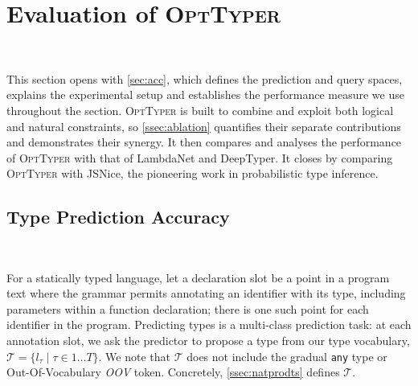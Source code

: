 \documentclass[acmsmall, review, anonymous]{acmart}\settopmatter{printfolios=true,printccs=false,printacmref=false}
\newcommand{\projectname}{\textsc{OptTyper}\xspace}
\begin{document}

\section{Evaluation of \projectname{}}~\label{sec:eval}

This section opens with \autoref{sec:acc}, which defines the prediction and query spaces, explains the experimental setup and establishes the performance measure we use throughout the section.
\projectname is built to combine and exploit both logical and natural constraints, so \autoref{ssec:ablation} quantifies their separate contributions and demonstrates their synergy.
It then compares and analyses the performance of \projectname with that of LambdaNet and DeepTyper.
It closes by comparing \projectname with JSNice, the pioneering work in probabilistic type inference.



\subsection{Type Prediction Accuracy}~\label{sec:acc}

For a statically typed language, let a declaration slot be a point in a program text where the grammar permits annotating an identifier with its type, including parameters within a function declaration; there is one such point for each identifier in the program.  Predicting types is a multi-class prediction task: at each annotation slot, we ask the predictor to propose a type from our type vocabulary, $\mathcal{T} = \{ l_\tau \mid \tau \in 1 \dots T \}$. We note that $\mathcal{T}$ does not include the gradual \texttt{\small{any}} type or Out-Of-Vocabulary \textit{OOV} token.  Concretely,
\autoref{ssec:natprodts} defines $\mathcal{T}$.
\end{document}
